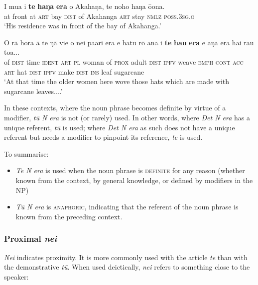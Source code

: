 \ea\label{ex:4.204}
\gll {\ꞌ}I mu{\ꞌ}a i \textbf{te} \textbf{haŋa} \textbf{era} o {\ꞌ}Akahaŋa, te noho haŋa ō{\ꞌ}ona. \\
at front at \textsc{art} bay \textsc{dist} of Akahanga \textsc{art} stay \textsc{nmlz} \textsc{poss.3sg.o} \\

\glt 
‘His residence was in front of the bay of Akahanga.’ \textstyleExampleref{[Blx-2-3.002]}
\z

\ea\label{ex:4.205}
\gll O rā hora {\ꞌ}ā te ŋā vi{\ꞌ}e o nei pa{\ꞌ}ari era e hatu rō {\ꞌ}ana  i \textbf{te} \textbf{ha{\ꞌ}u} \textbf{era} e aŋa era hai rau toa...\\
of \textsc{dist} time \textsc{ident} \textsc{art} \textsc{pl} woman of \textsc{prox} adult \textsc{dist} \textsc{ipfv} weave \textsc{emph} \textsc{cont}  \textsc{acc} \textsc{art} hat \textsc{dist} \textsc{ipfv} make \textsc{dist} \textsc{ins} leaf sugarcane\\

\glt
‘At that time the older women here wove those hats which are made with sugarcane leaves....’ \textstyleExampleref{[R106.049]} 
\z

In these contexts, where the noun phrase becomes definite by virtue of a modifier, \textit{tū N era} is not (or rarely) used. In other words, where \textit{Det N era} has a unique referent, \textit{tū} is used; where \textit{Det N era} as such does not have a unique referent but needs a modifier to pinpoint its reference, \textit{te} is used.

To summarise: 

\begin{itemize}
\item 
\textit{Te N era} is used when the noun phrase is \textsc{definite} for any reason (whether known from the context, by general knowledge, or defined by modifiers in the NP)

\item 
\textit{Tū N era} is \textsc{anaphoric}, indicating that the referent of the noun phrase is known from the preceding context.

\end{itemize}
\subsubsection{Proximal \textit{nei}}\label{sec:4.6.3.2}
\textit{Nei} indicates proximity. It is more commonly used with the article \textit{te} than with the demonstrative \textit{tū}. When used deictically, \textit{nei} refers to something close to the speaker:

